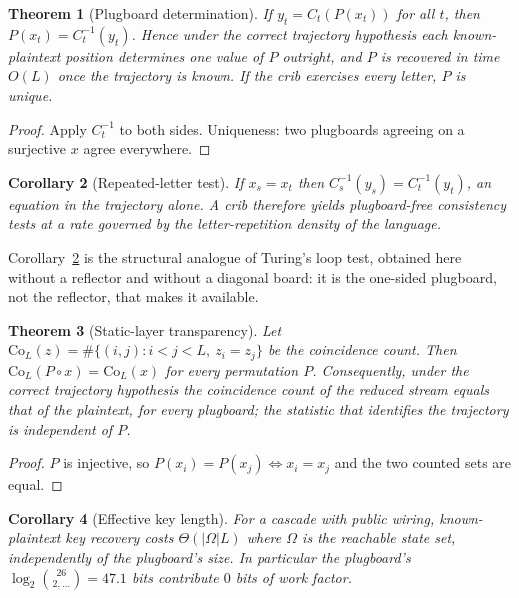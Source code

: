\documentclass[11pt]{article}
\newtheorem{theorem}{Theorem}
\newtheorem{corollary}[theorem]{Corollary}
\theoremstyle{definition}
\newcommand{\Om}{\Omega}
\begin{document}
\begin{theorem}[Plugboard determination]\label{thm:plugdet}
If $y_t = C_t(P(x_t))$ for all $t$, then $P(x_t) = C_t^{-1}(y_t)$. Hence under
the correct trajectory hypothesis each known-plaintext position determines one
value of $P$ outright, and $P$ is recovered in time $O(L)$ once the trajectory
is known. If the crib exercises every letter, $P$ is unique.
\end{theorem}

\begin{proof}
Apply $C_t^{-1}$ to both sides. Uniqueness: two plugboards agreeing on a
surjective $x$ agree everywhere.
\end{proof}

\begin{corollary}[Repeated-letter test]\label{cor:repeat}
If $x_s = x_t$ then $C_s^{-1}(y_s) = C_t^{-1}(y_t)$, an equation in the
trajectory alone. A crib therefore yields plugboard-free consistency tests at a
rate governed by the letter-repetition density of the language.
\end{corollary}

Corollary~\ref{cor:repeat} is the structural analogue of Turing's loop test,
obtained here without a reflector and without a diagonal board: it is the
one-sided plugboard, not the reflector, that makes it available.

\begin{theorem}[Static-layer transparency]\label{thm:transparency}
Let $\mathrm{Co}_L(z) = \#\{(i,j): i<j<L,\ z_i = z_j\}$ be the coincidence count.
Then $\mathrm{Co}_L(P\circ x) = \mathrm{Co}_L(x)$ for every permutation $P$.
Consequently, under the correct trajectory hypothesis the coincidence count of
the reduced stream equals that of the plaintext, for every plugboard; the
statistic that identifies the trajectory is independent of $P$.
\end{theorem}

\begin{proof}
$P$ is injective, so $P(x_i) = P(x_j) \iff x_i = x_j$ and the two counted sets
are equal.
\end{proof}

\begin{corollary}[Effective key length]\label{cor:effective}
For a cascade with public wiring, known-plaintext key recovery costs
$\Theta(|\Om| L)$ where $\Om$ is the reachable state set, independently of the
plugboard's size. In particular the plugboard's $\log_2\binom{26}{2,\dots}
= 47.1$ bits contribute $0$ bits of work factor.
\end{corollary}
\end{document}
